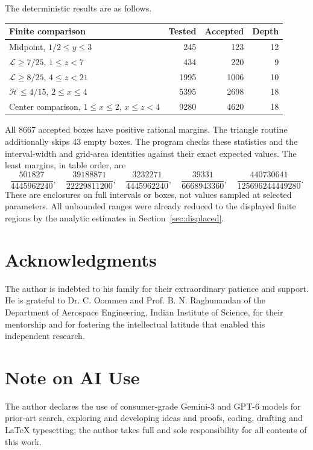 \documentclass[11pt,reqno]{amsart}
\numberwithin{equation}{section}
\begin{document}
The deterministic results are as follows.
\begin{center}
\small
\begin{tabular}{@{}lrrr@{}}
\toprule
Finite comparison & Tested & Accepted & Depth\\
\midrule
Midpoint, $1/2\le y\le3$ & 245 & 123 & 12\\
$\mathcal L\ge7/25$, $1\le z<7$ & 434 & 220 & 9\\
$\mathcal L\ge8/25$, $4\le z<21$ & 1995 & 1006 & 10\\
$\mathcal H\le4/15$, $2\le x\le4$ & 5395 & 2698 & 18\\
Center comparison, $1\le x\le2$, $x\le z<4$ & 9280 & 4620 & 18\\
\bottomrule
\end{tabular}
\end{center}
All 8667 accepted boxes have positive rational margins.
The triangle routine additionally skips 43 empty boxes.
The program checks these statistics and the interval-width
and grid-area identities against their exact expected values.
The least margins, in table order, are
\[
 \frac{501827}{4445962240},\quad
 \frac{39188871}{22229811200},\quad
 \frac{3232271}{4445962240},\quad
 \frac{39331}{6668943360},\quad
 \frac{440730641}{125696244449280}.
\]
These are enclosures on full intervals or boxes, not values
sampled at selected parameters. All unbounded ranges were
already reduced to the displayed finite regions by the
analytic estimates in Section~\ref{sec:displaced}.


\section*{Acknowledgments}
The author is indebted to his family for their extraordinary patience
and support. He is grateful to Dr. C. Oommen and Prof. B. N. Raghunandan
of the Department of Aerospace Engineering, Indian Institute of
Science, for their mentorship and for fostering the intellectual
latitude that enabled this independent research.


\section*{Note on AI Use}
The author declares the use of consumer-grade Gemini-3 and GPT-6 models for prior-art search, exploring and developing ideas and proofs, coding, drafting and LaTeX typesetting; the author takes full and sole responsibility for all contents of this work.
\end{document}
